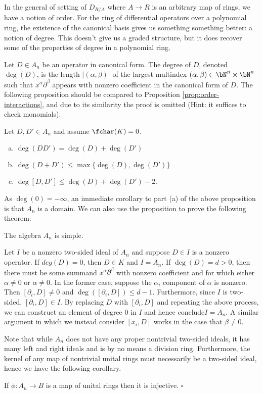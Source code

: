 In the general of setting of $D_{R/A}$ where $A\to R$ is an arbitrary map of rings, we have a notion of order. For the ring of differential operators over a polynomial ring, the existence of the canonical basis gives us something something better: a notion of degree. This doesn't give us a graded structure, but it does recover some of the properties of degree in a polynomial ring. 

Let $D \in A_n$ be an operator in canonical form. The degree of $D$, denoted $\deg(D)$, is the length $|(\alpha,\beta)|$ of the largest multindex $(\alpha,\beta) \in \bN^n\times \bN^n$ such that $x^\alpha\partial^\beta$ appears with nonzero coefficient in the canonical form of $D$. The following proposition should be compared to Proposition \ref{prop:order-interactions}, and due to its similarity the proof is omitted (Hint: it suffices to check monomials).
\begin{prop}\label{prop:degree-properties}
    Let $D,D' \in A_n$ and assume $\fchar(K) = 0$.
	\begin{enumerate}[(a)]
		\item $\deg(DD') = \deg(D) + \deg(D')$
		\item $\deg(D+D') \leq \max\{\deg(D), \deg(D')\}$
		\item $\deg[D,D']\leq \deg(D) + \deg(D') - 2$.
	\end{enumerate}
\end{prop}
As $\deg(0) = -\infty$, an immediate corollary to part (a) of the above proposition is that $A_n$ is a domain. We can also use the proposition to prove the following theorem:

\begin{thm}\label{thm:Weyl-algebra-simple}
	The algebra $A_n$ is simple.
\end{thm}
\begin{prf}
	Let $I$ be a nonzero two-sided ideal of $A_n$ and suppose $D \in I$ is a nonzero operator. If $deg(D) = 0$, then $D \in K$ and $I = A_n$. If $\deg(D) = d > 0$, then there must be some summand $x^\alpha\partial^\beta$ with nonzero coefficient and for which either $\alpha \neq 0$ or $\alpha \neq 0$. In the former case, suppose the $\alpha_i$ component of $\alpha$ is nonzero. Then $[\partial_i,D] \neq 0$ and $\deg([\partial_i,D]) \leq d - 1$. Furthermore, since $I$ is two-sided, $[\partial_i,D] \in I$. By replacing $D$ with $[\partial_i,D]$ and repeating the above process, we can construct an element of degree 0 in $I$ and hence conclude$I = A_n$. A similar argument in which we instead consider $[x_i,D]$ works in the case that $\beta \neq 0$.
\end{prf}
Note that while $A_n$ does not have any proper nontrivial two-sided ideals, it has many left and right ideals and is by no means a division ring. Furthermore, the kernel of any map of nontrivial unital rings must necessarily be a two-sided ideal, hence we have the following corollary.
\begin{cor}\label{cor:maps-from-Weyl-inj}
	If $\phi:A_n\to B$ is a map of unital rings then it is injective. \hfill $\square$
\end{cor}

